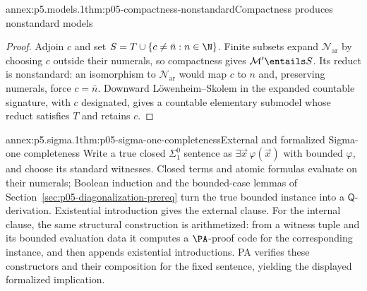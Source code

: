
\begin{annexitem}{annex:p5.models.1}{thm:p05-compactness-nonstandard}{Compactness produces nonstandard models}
\begin{proof}
Adjoin \(c\) and set \(S=T\cup\{c\neq\bar n:n\in\N\}\).  Finite subsets
expand \(\mathcal N_{\mathrm{ar}}\) by choosing \(c\) outside their
numerals, so compactness gives \(\mathcal M'\entails S\).  Its reduct is
nonstandard: an isomorphism to \(\mathcal N_{\mathrm{ar}}\) would map \(c\)
to \(n\) and, preserving numerals, force \(c=\bar n\).  Downward
L\"owenheim--Skolem in the expanded countable signature, with \(c\)
designated, gives a countable elementary submodel whose reduct satisfies
\(T\) and retains \(c\).
\end{proof}
\end{annexitem}

\begin{annexitem}{annex:p5.sigma.1}{thm:p05-sigma-one-completeness}{External and formalized Sigma-one completeness}
Write a true closed \(\Sigma^0_1\) sentence as
\(\exists\vec x\,\varphi(\vec x)\) with bounded \(\varphi\), and choose
its standard witnesses.  Closed terms and atomic formulas evaluate on
their numerals; Boolean induction and the bounded-case lemmas of
Section~\ref{sec:p05-diagonalization-prereq} turn the true bounded
instance into a \(\mathsf Q\)-derivation.  Existential introduction gives
the external clause.  For the internal clause, the same structural
construction is arithmetized: from a witness tuple and its bounded
evaluation data it computes a \(\PA\)-proof code for the corresponding
instance, and then appends existential introductions.  PA verifies these
constructors and their composition for the fixed sentence, yielding the
displayed formalized implication.
\end{annexitem}
